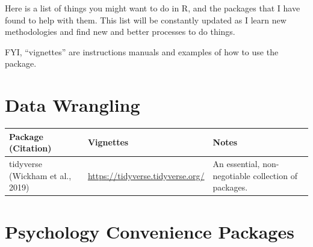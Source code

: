 \documentclass[
  letterpaper,
  DIV=11,
  numbers=noendperiod]{scrreprt}
\begin{document}
Here is a list of things you might want to do in R, and the packages
that I have found to help with them. This list will be constantly
updated as I learn new methodologies and find new and better processes
to do things.

FYI, ``vignettes'' are instructions manuals and examples of how to use
the package.

\section{Data Wrangling}\label{data-wrangling}

\begin{longtable}[]{@{}
  >{\raggedright\arraybackslash}p{}
  >{\raggedright\arraybackslash}p{}
  >{\raggedright\arraybackslash}p{}@{}}
\toprule\noalign{}
\begin{minipage}[b]{\linewidth}\raggedright
Package (Citation)
\end{minipage} & \begin{minipage}[b]{\linewidth}\raggedright
Vignettes
\end{minipage} & \begin{minipage}[b]{\linewidth}\raggedright
Notes
\end{minipage} \\
\midrule\noalign{}
\endhead
\bottomrule\noalign{}
\endlastfoot
tidyverse (Wickham et al., 2019) &
\url{https://tidyverse.tidyverse.org/} & An essential, non-negotiable
collection of packages. \\
\end{longtable}

\section{Psychology Convenience
Packages}\label{psychology-convenience-packages}
\end{document}
